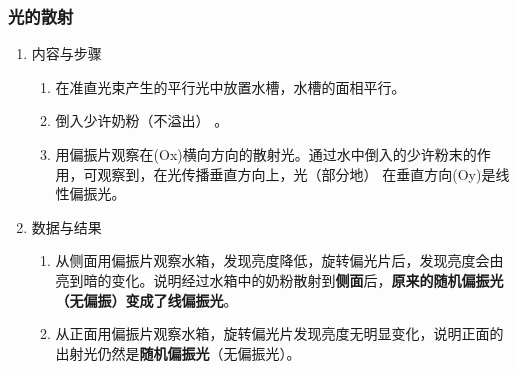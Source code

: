 \documentclass[dvipsnames, svgnames,a4paper,11pt]{article}
\begin{document}
	\subsubsection{光的散射}
	\begin{enumerate}
		\item 内容与步骤
		
		\begin{enumerate}
			\item 在准直光束产生的平行光中放置水槽，水槽的面相平行。
			\item 倒入少许奶粉（不溢出） 。
			\item 用偏振片观察在(Ox)横向方向的散射光。通过水中倒入的少许粉末的作用，可观察到，在光传播垂直方向上，光（部分地） 在垂直方向(Oy)是线性偏振光。
		\end{enumerate}
		
		
		\item 数据与结果
		
		\begin{enumerate}
			\item 从侧面用偏振片观察水箱，发现亮度降低，旋转偏光片后，发现亮度会由亮到暗的变化。说明经过水箱中的奶粉散射到\textbf{侧面}后，\textbf{原来的随机偏振光（无偏振）变成了线偏振光}。
			\item 从正面用偏振片观察水箱，旋转偏光片发现亮度无明显变化，说明正面的出射光仍然是\textbf{随机偏振光}（无偏振光）。
		\end{enumerate}
		
	\end{enumerate}	
	
\end{document}
